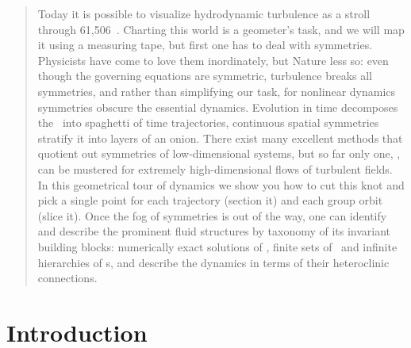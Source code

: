 \documentclass[aip,cha,reprint,
secnumarabic,
nofootinbib, tightenlines,
nobibnotes, showkeys, showpacs,
]{revtex4-1}
\begin{document}
\begin{quotation}
Today it is possible to visualize hydrodynamic turbulence as a stroll
through 61,506\dmn\ \statesp. Charting this world is a geometer's task,
and we will map it using a measuring tape, but first one has to deal with
symmetries. Physicists have come to love them inordinately, but Nature
less so: even though the governing equations are symmetric, turbulence
breaks all symmetries, and rather than simplifying our task, for
nonlinear dynamics symmetries obscure the essential dynamics. Evolution
in time decomposes the \statesp\ into spaghetti of time trajectories,
continuous spatial symmetries stratify it into layers of an onion. There
exist many excellent methods that quotient out symmetries of
low-dimensional systems, but so far only one, \mslices, can be mustered
for extremely high-dimensional flows of turbulent fields. In this
geometrical tour of dynamics we show you how to cut this knot and pick a
single point for each trajectory (section it) and each group orbit (slice
it). Once the fog of symmetries is out of the way, one can identify and
describe the prominent fluid structures by taxonomy of its invariant
building blocks: numerically exact solutions of \NSe, finite sets of
\reqva\ and infinite hierarchies of \rpo s, and describe the dynamics in
terms of their heteroclinic connections.
\end{quotation}

\section{Introduction}
\label{s:intro}

\end{document}
